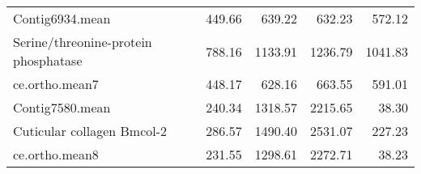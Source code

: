 \begin{table}[ht]
\begin{center}
\begin{tabular}{p{5cm}rrrr}
   \hline
Contig6934.mean & 449.66 & 639.22 & 632.23 & 572.12 \\ 
  Serine/threonine-protein phosphatase & 788.16 & 1133.91 & 1236.79 & 1041.83 \\ 
  ce.ortho.mean7 & 448.17 & 628.16 & 663.55 & 591.01 \\ 
   \hline
Contig7580.mean & 240.34 & 1318.57 & 2215.65 & 38.30 \\ 
  Cuticular collagen Bmcol-2 & 286.57 & 1490.40 & 2531.07 & 227.23 \\ 
  ce.ortho.mean8 & 231.55 & 1298.61 & 2272.71 & 38.23 \\ 
   \hline
\end{tabular}
\end{center}
\end{table}

